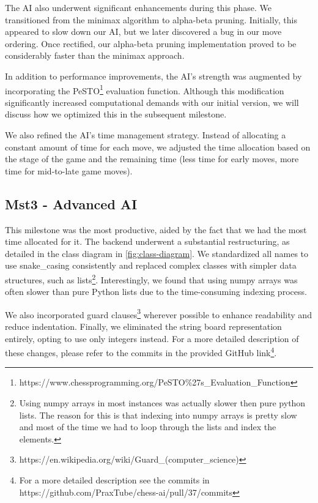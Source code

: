 The AI also underwent significant enhancements during this phase. We transitioned from the minimax algorithm to alpha-beta pruning. Initially, this appeared to slow down our AI, but we later discovered a bug in our move ordering. Once rectified, our alpha-beta pruning implementation proved to be considerably faster than the minimax approach.

In addition to performance improvements, the AI's strength was augmented by incorporating the PeSTO\footnote{https://www.chessprogramming.org/PeSTO\%27s\_Evaluation\_Function} evaluation function. Although this modification significantly increased computational demands with our initial version, we will discuss how we optimized this in the subsequent milestone.

We also refined the AI's time management strategy. Instead of allocating a constant amount of time for each move, we adjusted the time allocation based on the stage of the game and the remaining time (less time for early moves, more time for mid-to-late game moves).

\subsection{Mst3 - Advanced AI}

This milestone was the most productive, aided by the fact that we had the most time allocated for it. The backend underwent a substantial restructuring, as detailed in the class diagram in \autoref{fig:class-diagram}. We standardized all names to use snake\_casing consistently and replaced complex classes with simpler data structures, such as lists\footnote{Using numpy arrays in most instances
was actually slower then pure python lists. The reason
for this is that indexing into numpy arrays is pretty
slow and most of the time we had to loop through
the lists and index the elements.}. Interestingly, we found that using numpy arrays was often slower than pure Python lists due to the time-consuming indexing process.

We also incorporated guard clauses\footnote{https://en.wikipedia.org/wiki/Guard\_(computer\_science)} wherever possible to enhance readability and reduce indentation. Finally, we eliminated the string board representation entirely, opting to use only integers instead. For a more detailed description of these changes, please refer to the commits in the provided GitHub link\footnote{For a more detailed description see the commits in https://github.com/PraxTube/chess-ai/pull/37/commits}.


